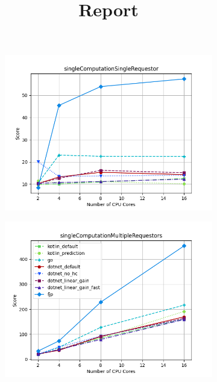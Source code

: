 \documentclass{article}
\title{Report}
\date{}
\begin{document}
\begin{figure}[H]
    \centering
    \begin{subfigure}[b]{0.48\textwidth}
        \includegraphics[width=\linewidth]{plots/singleComputationSingleRequestor.png}
    \end{subfigure}
    \begin{subfigure}[b]{0.48\textwidth}
        \includegraphics[width=\linewidth]{plots/singleComputationMultipleRequestors_with_legend.png}
    \end{subfigure}

    \vspace{1em}


\end{figure}
\end{document}
